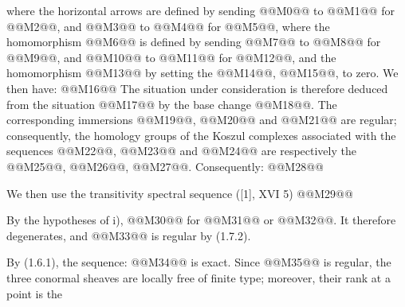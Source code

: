 where the horizontal arrows are defined by sending @@M0@@ to @@M1@@ for @@M2@@, and @@M3@@ to @@M4@@ for @@M5@@, where the homomorphism @@M6@@ is defined by sending @@M7@@ to @@M8@@ for @@M9@@, and @@M10@@ to @@M11@@ for @@M12@@, and the homomorphism @@M13@@ by setting the @@M14@@, @@M15@@, to zero. We then have:
@@M16@@
The situation under consideration is therefore deduced from the situation @@M17@@ by the base change @@M18@@. The corresponding immersions @@M19@@, @@M20@@ and @@M21@@ are regular; consequently, the homology groups of the Koszul complexes associated with the sequences @@M22@@, @@M23@@ and @@M24@@ are respectively the @@M25@@, @@M26@@, @@M27@@. Consequently:
@@M28@@

We then use the transitivity spectral sequence ([1], XVI 5)
@@M29@@

By the hypotheses of i), @@M30@@ for @@M31@@ or @@M32@@. It therefore degenerates, and @@M33@@ is regular by (1.7.2).

By (1.6.1), the sequence:
@@M34@@
is exact. Since @@M35@@ is regular, the three conormal sheaves are locally free of finite type; moreover, their rank at a point is the

